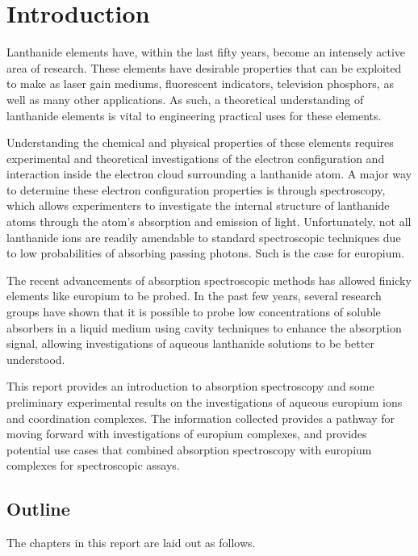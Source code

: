 \chapter*{Introduction}

Lanthanide elements have, within the last fifty years, become an intensely
active area of research. These elements have desirable properties that can be
exploited to make as laser gain mediums, fluorescent indicators, television
phosphors, as well as many other applications. As such, a theoretical
understanding of lanthanide elements is vital to engineering practical uses for
these elements.

Understanding the chemical and physical properties of these elements requires
experimental and theoretical investigations of the electron configuration and
interaction inside the electron cloud surrounding a lanthanide atom. A major
way to determine these electron configuration properties is through
spectroscopy, which allows experimenters to investigate the internal structure
of lanthanide atoms through the atom's absorption and emission of light.
Unfortunately, not all lanthanide ions are readily amendable to standard
spectroscopic techniques due to low probabilities of absorbing passing photons.
Such is the case for europium.

The recent advancements of absorption spectroscopic methods has allowed finicky
elements like europium to be probed. In the past few years, several research
groups have shown that it is possible to probe low concentrations of soluble
absorbers in a liquid medium using cavity techniques to enhance the absorption
signal, allowing investigations of aqueous lanthanide solutions to be better
understood.

This report provides an introduction to absorption spectroscopy and some
preliminary experimental results on the investigations of aqueous europium ions
and coordination complexes. The information collected provides a pathway for
moving forward with investigations of europium complexes, and provides
potential use cases that combined absorption spectroscopy with europium
complexes for spectroscopic assays.

\section*{Outline}

The chapters in this report are laid out as follows.

